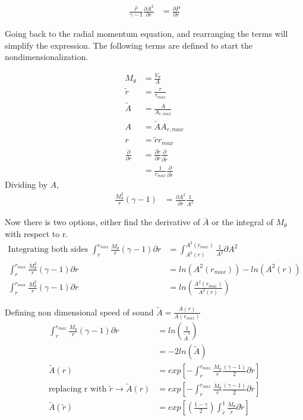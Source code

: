 \begin{align*}
    \frac{\bar{\rho}}{\gamma -1}\frac{\partial A^2}{\partial r} &= \frac{\partial P}{\partial r} 
\end{align*}

Going back to the radial momentum equation, and rearranging the terms will simplify 
the expression. The following terms are defined to start the
nondimensionalization.  

\begin{align*}
    M_{\theta} &= \frac{V_{\theta}}{A} \\ 
    \widetilde{r} &= \frac{r}{r_{max}}  \\
    \widetilde{A} &= \frac{A}{A_{r,max}}  \\
    A &= \widetilde{A}{A_{r,max}} \\
    r &= \widetilde{r}{r_{max}}\\
    \frac{\partial}{\partial r} &=
    \frac{\partial \widetilde{r}}{\partial r} \frac{\partial}{\partial \widetilde{r}}\\
                                &= \frac{1}{r_{max}}\frac{\partial}{\partial \widetilde{r}}
\end{align*}
Dividing by $A$,
\begin{align*}
    \frac{M_{\theta}^2}{r}\left(\gamma - 1\right) 
 &= \frac{\partial A^2}{\partial r} \frac{1}{A^2}
\end{align*}

Now there is two options, either find the derivative of  $\bar{A}$ or the integral of
$M_{\theta}$ with respect to r.
\begin{align*}
\text{Integrating both sides } \int_{r}^{r_{max}}\frac{M_{\theta}}{r}\left(\gamma - 1\right){\partial r}  &=\int_{A^2(r)}^{A^2(r_{max})}\frac{1}{A^2}  {\partial A^2}\\
\int_{r}^{r_{max}}\frac{M^2_{\theta}}{r}\left(\gamma - 1\right){\partial r}  &=ln(A^2(r_{max})) - ln(A^2(r)) \\
\int_{r}^{r_{max}}\frac{M^2_{\theta}}{r}\left(\gamma - 1\right){\partial r}  &=ln\left(\frac{A^2(r_{max})}{A^2(r)}\right) 
\end{align*}

Defining non dimensional speed of sound $\tilde{A} = \frac{A(r)}{A(r_{max})}$
\begin{align*}
\int_{r}^{r_{max}}\frac{M_{\theta}}{r}\left(\gamma - 1\right){\partial r}  &=ln\left(\frac{1}{\tilde{A}^2}\right) \\
&= -2ln(\tilde{A})\\
\tilde{A}(r) &= exp\left[-\int_{r}^{r_{max}}\frac{M_{\theta}}{r}\frac{\left(\gamma - 1\right)}{2}{\partial r}\right] \\ \text{replacing r with }\tilde{r} \rightarrow \tilde{A}(r) &= exp\left[-\int_{r}^{r_{max}}\frac{M_{\theta}}{r}\frac{\left(\gamma - 1\right)}{2}{\partial r}\right]\\
\tilde{A}(\tilde{r}) &= exp\left[\left(\frac{1 - \gamma}{2}\right)\int_{\tilde{r}}^{1}\frac{M_{\theta}}{\tilde{r}}{\partial \tilde{r}}\right]	
\end{align*}

